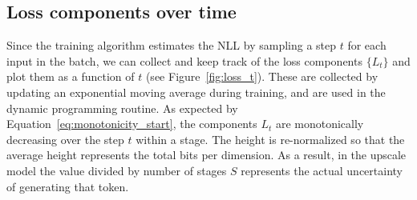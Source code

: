 \documentclass{article} \usepackage{iclr2022_conference,times}
\begin{document}
\begin{table}
\vspace{-.3cm}
\centering
\begin{table}[H]
    \centering
    \caption{Audio (SC09) depth upscaling test set performance (in bpd) for various computational budgets.}
    \label{tab:depth_upscaling_sc09_budget}
\end{table}
\end{table}

\subsection{Loss components over time}
Since the training algorithm estimates the NLL by sampling a step $t$ for each input in the batch, we can collect and keep track of the loss components $\{L_t\}$ and plot them as a function of $t$ (see Figure~\ref{fig:loss_t}). These are collected by updating an exponential moving average during training, and are used in the dynamic programming routine. As expected by Equation~\ref{eq:monotonicity_start}, the components $L_t$ are monotonically decreasing over the step $t$ within a stage. The height is re-normalized so that the average height represents the total bits per dimension. As a result, in the upscale model the value divided by number of stages $S$ represents the actual uncertainty of generating that token.
\end{document}
